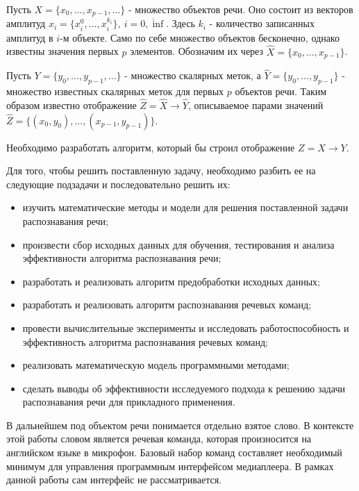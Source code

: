 Пусть $X=\{x_0, ..., x_{p-1}, ...\}$ - множество объектов речи. Оно состоит из векторов амплитуд $x_i=\{x_i^0, ..., x_i^{k_i}\},~i=\overline{0,\inf}$. Здесь $k_i$ - количество записанных амплитуд в $i$-м объекте. Само по себе множество объектов бесконечно, однако известны значения первых $p$ элементов. Обозначим их через $\widehat{X}=\{x_0, ..., x_{p-1}\}$.  

Пусть $Y=\{y_0, ..., y_{p-1}, ...\}$ - множество скалярных меток, а $\widehat{Y}=\{y_0, ..., y_{p-1}\}$ - множество известных скалярных меток для первых $p$ объектов речи. Таким образом известно отображение $\widehat{Z}=\widehat{X} \rightarrow \widehat{Y}$, описываемое парами значений $\widehat{Z}=\{(x_0, y_0), ..., (x_{p-1}, y_{p-1})\}$.

Необходимо разработать алгоритм, который бы строил отображение $Z = X \rightarrow Y$.

Для того, чтобы решить поставленную задачу, необходимо разбить ее на следующие подзадачи и последовательно решить их:
\begin{itemize}[leftmargin=2cm]
\item изучить математические методы и модели для решения поставленной задачи распознавания речи;
\item произвести сбор исходных данных для обучения, тестирования и анализа эффективности алгоритма распознавания речи;
\item разработать и реализовать алгоритм предобработки исходных данных;
\item разработать и реализовать алгоритм распознавания речевых команд;
\item провести вычислительные эксперименты и исследовать работоспособность и эффективность алгоритма распознавания речевых команд;
\item реализовать математическую модель программными методами;
\item сделать выводы об эффективности исследуемого подхода к решению задачи распознавания речи для прикладного применения.
\end{itemize}

В дальнейшем под объектом речи понимается отдельно взятое слово. В контексте этой работы словом является речевая команда, которая произносится на английском языке в микрофон. Базовый набор команд составляет необходимый минимум для управления программным интерфейсом медиаплеера. В рамках данной работы сам интерфейс не рассматривается.
